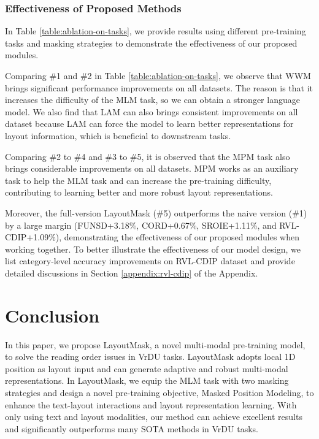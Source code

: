 \documentclass[11pt]{article}
\begin{document}
\subsubsection{Effectiveness of Proposed Methods}





In Table \ref{table:ablation-on-tasks}, we provide results using different pre-training tasks and masking strategies to demonstrate the effectiveness of our proposed modules. 

Comparing \#1 and \#2 in Table \ref{table:ablation-on-tasks}, we observe that WWM brings significant performance improvements on all datasets. The reason is that it increases the difficulty of the MLM task, so we can obtain a stronger language model.  
We also find that LAM can also brings consistent improvements on all dataset because LAM can force the model to learn better representations for layout information, which is beneficial to downstream tasks. 

Comparing \#2 to \#4 and \#3 to \#5, it is observed that the MPM task also brings considerable improvements on all datasets. MPM works as an auxiliary task to help the MLM task and can increase the pre-training difficulty, contributing to learning better and more robust layout representations.

Moreover, the full-version LayoutMask  (\#5) outperforms the naive version (\#1) by a large margin (FUNSD+3.18\%, CORD+0.67\%, SROIE+1.11\%, and RVL-CDIP+1.09\%), demonstrating the effectiveness of our proposed modules when working together.
To better illustrate the effectiveness of our model design, we list category-level accuracy improvements on RVL-CDIP dataset and provide detailed discussions in Section \ref{appendix:rvl-cdip} of the Appendix.

\section{Conclusion}
In this paper, we propose LayoutMask, a novel multi-modal pre-training model, to solve the reading order issues in VrDU tasks.
LayoutMask adopts local 1D position as layout input and can generate adaptive and robust multi-modal representations.
In LayoutMask, we equip the MLM task with two masking strategies and design a novel pre-training objective, Masked Position Modeling, to enhance the text-layout interactions and layout representation learning. 
With only using text and layout modalities, our method can achieve excellent results and significantly outperforms many SOTA methods in VrDU tasks. 
\end{document}
